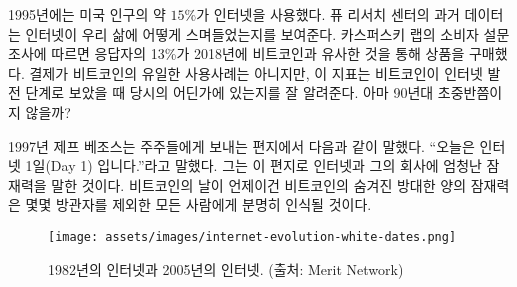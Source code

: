 \begin{comment}
In 1995, about $15\%$ of American adults used the internet. Historical
data from the Pew Research Center~\cite{pew-research} shows how the internet has woven
itself into all our lives. According to a consumer survey by Kaspersky
Lab~\cite{web:kaspersky}, 13\% of respondents have used Bitcoin and its clones to pay for
goods in 2018. While payments aren't the only use-case of bitcoin, it is
some indication of where we are in Internet time: in the early- to
mid-90s.
\end{comment}
1995년에는 미국 인구의 약 $15\%$가 인터넷을 사용했다.
퓨 리서치 센터\cite{pew-research}의 과거 데이터는 인터넷이 우리 삶에 어떻게 스며들었는지를 보여준다.
카스퍼스키 랩\cite{web:kaspersky}의 소비자 설문 조사에 따르면 
응답자의 13\%가 2018년에 비트코인과 유사한 것을 통해 상품을 구매했다.
결제가 비트코인의 유일한 사용사례는 아니지만, 
이 지표는 비트코인이 인터넷 발전 단계로 보았을 때 당시의 어딘가에 있는지를 잘 알려준다.
아마 90년대 초중반쯤이지 않을까?

\begin{comment}
In 1997, Jeff Bezos stated in a letter to shareholders~\cite{bezos-letter} that
\enquote{this is Day 1 for the Internet,} recognizing the great untapped
potential for the internet and, by extension, his company. Whatever day this is
for Bitcoin, the vast amounts of untapped potential are clear to all but the
most casual observer.
\end{comment}
1997년 제프 베조스는 주주들에게 보내는 편지\cite{bezos-letter}에서 다음과 같이 말했다.
\enquote{오늘은 인터넷 1일(Day 1) 입니다.}라고 말했다.
그는 이 편지로 인터넷과 그의 회사에 엄청난 잠재력을 말한 것이다.
비트코인의 날이 언제이건 비트코인의 숨겨진 방대한 양의 잠재력은 
몇몇 방관자를 제외한 모든 사람에게 분명히 인식될 것이다.


\begin{figure}
  \texttt{[image: assets/images/internet-evolution-white-dates.png]}
  \caption{1982년의 인터넷과 2005년의 인터넷. (출처: Merit Network)}
  \label{fig:internet-evolution-white-dates}
\end{figure}

